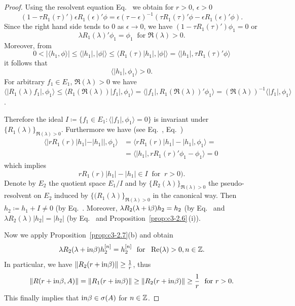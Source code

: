 \begin{proof}
Using the resolvent equation Eq.~ we obtain for $r > 0$, $\epsilon > 0$
\[
(1 - \tau R_{1}(\tau)')\epsilon R_{1}(\epsilon)'\phi = \epsilon(\tau-\epsilon)^{-1}(\tau R_{1}(\tau)'\phi - \epsilon R_{1}(\epsilon)'\phi) .
\]
Since the right hand side tends to $0$ as $\epsilon \to 0$, we have $(1 - \tau R_{1}(\tau)')\phi_{1} = 0$ or
\begin{equation}\label{eq:c3-2.18}
\lambda R_{1}(\lambda)'\phi_{1} = \phi_{1} \ \text{ for } \Re(\lambda) > 0 .
\end{equation} 
Moreover, from 
\[
0 < |\langle h_{1},\phi \rangle| \leq \langle |h_{1}|,|\phi| \rangle \leq \langle R_{1}(\tau)|h_{1}|,|\phi| \rangle = \langle |h_{1}|,\tau R_{1}(\tau)'\phi \rangle 
\]
it follows that
\begin{equation}\label{eq:c3-2.19}
		\langle |h_{1}|,\phi_{1} \rangle > 0 .
\end{equation}
For arbitrary $f_{1} \in E_{1}$, $\Re(\lambda) > 0$ we have $\langle |R_{1}(\lambda)f_{1}|,\phi_{1} \rangle \leq \langle R_{1}(\Re(\lambda))|f_{1}|,\phi_{1} \rangle = \langle |f_{1}|,R_{1}(\Re(\lambda))'\phi_{1} \rangle = (\Re(\lambda))^{-1}\langle |f_{1}|,\phi_{1} \rangle$.

Therefore the ideal $I \coloneq \{f_{1} \in E_{1} \colon \langle |f_{1}|,\phi_{1} \rangle = 0\}$ is invariant under $\{R_{1}(\lambda)\}_{\Re(\lambda)>0}$.
Furthermore we have (see Eq.~, Eq.~) 
\begin{align*}
	\langle |rR_{1}(r)|h_{1}| - |h_{1}||,\phi_{1} \rangle &= \langle rR_{1}(r)|h_{1}| - |h_{1}|,\phi_{1} \rangle = \\
	& = \langle |h_{1}|,rR_{1}(r)'\phi_{1} - \phi_{1} \rangle = 0\ 
\end{align*}	
which implies
\begin{equation}\label{eq:c3-2.20}
rR_{1}(r)|h_{1}| - |h_{1}| \in I \ \text{ for } \ r > 0) .
\end{equation}
Denote by $E_{2}$ the quotient space $E_{1}/I$ and by $\{R_{2}(\lambda)\}_{\Re(\lambda)>0}$ the pseudo-resolvent on $E_{2}$ induced by $\{(R_{1}(\lambda)\}_{\Re(\lambda)>0}$ in the canonical way. 
Then $h_{2} \coloneq h_{1} + I \neq 0$ (by Eq.~\myeqpageref{eq:c3-2.19}.
Moreover, $\lambda R_{2}(\lambda+\mathrm{i}\beta)h_{2} = h_{2}$ (by Eq.~ and $\lambda R_{2}(\lambda)|h_{2}| = |h_{2}|$ (by Eq.~ and Proposition~\ref{prop:c3-2.6}\,(i)).

Now we apply Proposition~\ref{prop:c3-2.7}(b) and obtain
\begin{equation}\label{eq:c3-2.21}
	\lambda R_{2}(\lambda+\mathrm{i} n\beta)h_{2}^{[n]} = h_{2}^{[n]}\ \text{ for } \ \mathop{}\!\mathrm{Re}(\lambda) > 0 , n \in \mathbb{Z} .
\end{equation}
In particular, we have $\|R_{2}(r+\im n\beta)\| \geq \frac{1}{r}$, thus 
\[
\|R(r+\im n\beta,A)\| = \|R_{1}(r+\im n\beta)\| \geq \|R_{2}(r+\im n\beta)\| \geq \frac{1}{r} \ \text{ for } r > 0 .
\]
This finally implies that $ \mathrm{i} n\beta \in \sigma(A)$ for $n \in \mathbb{Z}$.
\end{proof}
